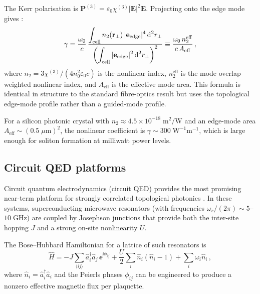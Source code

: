 The Kerr polarisation is
$\mathbf{P}^{(3)}=\varepsilon_0\chi^{(3)}|\mathbf{E}|^2\mathbf{E}$.
Projecting onto the edge mode gives \cite{price2022roadmap}:
\begin{equation}\label{eq:ch18-gamma-integral}
  \gamma = \frac{\omega_0}{c}\,
  \frac{\displaystyle\int_{\mathrm{cell}}
  n_2(\mathbf{r}_\perp)\,|\mathbf{e}_{\mathrm{edge}}|^4\,\mathrm{d}^2 r_\perp}
  {\displaystyle\left(\int_{\mathrm{cell}}
  |\mathbf{e}_{\mathrm{edge}}|^2\,\mathrm{d}^2 r_\perp\right)^2}
  \equiv \frac{\omega_0\,n_2^{\mathrm{eff}}}{c\,A_{\mathrm{eff}}}\,,
\end{equation}
where $n_2=3\chi^{(3)}/(4n_0^2\varepsilon_0 c)$ is the nonlinear
index, $n_2^{\mathrm{eff}}$ is the mode-overlap-weighted nonlinear
index, and $A_{\mathrm{eff}}$ is the effective mode area.  This
formula is identical in structure to the standard fibre-optics result
but uses the topological edge-mode profile rather than a guided-mode
profile.

For a silicon photonic crystal with $n_2\approx
4.5\times 10^{-18}\;\mathrm{m}^2/\mathrm{W}$ and an edge-mode area
$A_{\mathrm{eff}}\sim(0.5\;\mu\mathrm{m})^2$, the nonlinear
coefficient is $\gamma\sim 300\;\mathrm{W}^{-1}\mathrm{m}^{-1}$,
which is large enough for soliton formation at milliwatt power levels.

\subsection{Circuit QED platforms}
\label{sec:ch18-circuit-qed}

Circuit quantum electrodynamics (circuit QED) provides the most
promising near-term platform for strongly correlated topological
photonics \cite{ozawa2018topological,tschernig2021topological}.  In these systems,
superconducting microwave resonators (with frequencies
$\omega_r/(2\pi)\sim 5$--$10\;\mathrm{GHz}$) are coupled by Josephson
junctions that provide both the inter-site hopping $J$ and a strong
on-site nonlinearity $U$.

The Bose--Hubbard Hamiltonian for a lattice of such resonators is
\begin{equation}\label{eq:ch18-bose-hubbard}
  \hat{H} = -J\sum_{\langle ij\rangle}
  \hat{a}_i^\dagger\hat{a}_j\,\ee^{\ii\phi_{ij}}
  + \frac{U}{2}\sum_i \hat{n}_i(\hat{n}_i-1)
  + \sum_i\omega_i\hat{n}_i\,,
\end{equation}
where $\hat{n}_i=\hat{a}_i^\dagger\hat{a}_i$ and the Peierls phases
$\phi_{ij}$ can be engineered to produce a nonzero effective magnetic
flux per plaquette.

